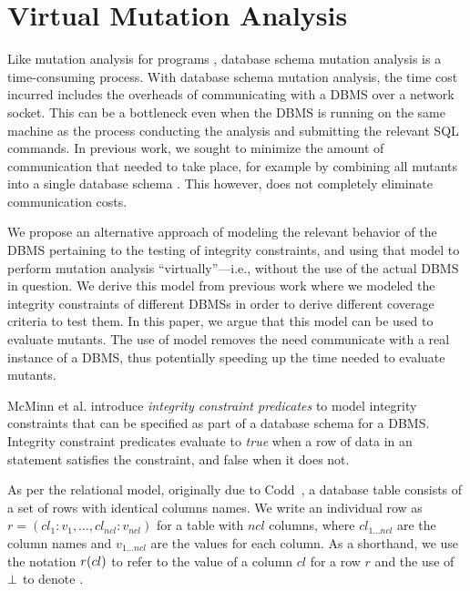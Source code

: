 
\section{Virtual Mutation Analysis}
\label{sec:virtual-mutation-analysis}

Like mutation analysis for programs \cite{}, database schema mutation analysis is a time-consuming process. With database schema mutation analysis, the time cost incurred includes the overheads of communicating with a DBMS over a network socket. This can be a bottleneck even when the DBMS is running on the same machine as the process conducting the analysis and submitting the relevant SQL commands. 
In previous work, we sought to minimize the amount of communication that needed to take place, for example by combining all mutants into a single database schema \cite{Wright2013}. This however, does not completely eliminate communication costs.

We propose an alternative approach of modeling the relevant behavior of the DBMS pertaining to the testing of integrity constraints, and using that model to perform mutation analysis ``virtually''---i.e., without the use of the actual DBMS in question. We derive this model from previous work \cite{McMinn2015} where we modeled the integrity constraints of different DBMSs in order to derive different coverage criteria to test them. In this paper, we argue that this model can be used to evaluate mutants. The use of model removes the need communicate with a real instance of a DBMS, thus potentially speeding up the time needed to evaluate mutants.

McMinn et al. introduce {\it integrity constraint predicates} to model integrity constraints that can be specified as part of a database schema for a DBMS. Integrity constraint predicates evaluate to {\it true} when a row of data in an \INSERT statement satisfies the constraint, and false when it does not.

As per the relational model, originally due to Codd~\cite{Codd1970}, a database table consists of a set of rows with identical columns names. We write an individual row as $r = (cl_1:v_1, \dots, cl_{ncl}:v_{ncl})$ for a table with $ncl$ columns, where $cl_{1 \ldots ncl}$ are the column names and $v_{1 \ldots ncl}$ are the values for each column. As a shorthand, we use the notation $r (cl)$ to refer to the value of a column $cl$ for a row $r$ and the use of $\bot$ to denote \NULL.

